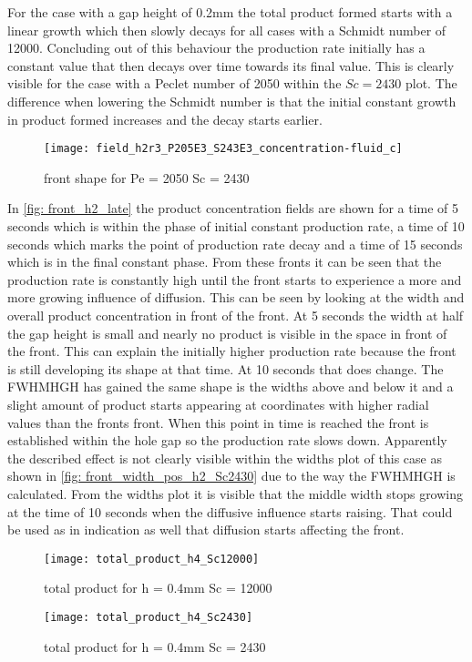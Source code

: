 \documentclass[../thesis.tex]{subfiles}
\begin{document}
For the case with a gap height of 0.2mm the total product formed starts with a linear growth which then slowly decays for all cases with a Schmidt number of 12000. Concluding out of this behaviour the production rate initially has a constant value that then decays over time towards its final value. This is clearly visible for the case with a Peclet number of 2050 within the $Sc = 2430$ plot. The difference when lowering the Schmidt number is that the initial constant growth in product formed increases and the decay starts earlier.
\begin{figure}[htb]
	\centering
	\texttt{[image: field\_h2r3\_P205E3\_S243E3\_concentration-fluid\_c]}
	\caption{front shape for Pe = 2050 Sc = 2430}
	\label{fig: front_h2_late}
\end{figure}
In \autoref{fig: front_h2_late} the product concentration fields are shown for a time of 5 seconds which is within the phase of initial constant production rate, a time of 10 seconds which marks the point of production rate decay and a time of 15 seconds which is in the final constant phase. From these fronts it can be seen that the production rate is constantly high until the front starts to experience a more and more growing influence of diffusion. This can be seen by looking at the width and overall product concentration in front of the front. At 5 seconds the width at half the gap height is small and nearly no product is visible in the space in front of the front. This can explain the initially higher production rate because the front is still developing its shape at that time. At 10 seconds that does change. The FWHMHGH has gained the same shape is the widths above and below it and a slight amount of product starts appearing at coordinates with higher radial values than the fronts front. When this point in time is reached the front is established within the hole gap so the production rate slows down. Apparently the described effect is not clearly visible within the widths plot of this case as shown in \autoref{fig: front_width_pos_h2_Sc2430} due to the way the FWHMHGH is calculated. From the widths plot it is visible that the middle width stops growing at the time of 10 seconds when the diffusive influence starts raising. That could be used as in indication as well that diffusion starts affecting the front.

\begin{figure}[htbp]
	\centering
	\texttt{[image: total\_product\_h4\_Sc12000]}
	\caption{total product for  h = 0.4mm Sc = 12000\label{fig: total_prod_h4_Sc12000}}\bigskip
	\texttt{[image: total\_product\_h4\_Sc2430]}
	\caption{total product for  h = 0.4mm Sc = 2430\label{fig: total_prod_h4_Sc2430}}
\end{figure}
\end{document}
